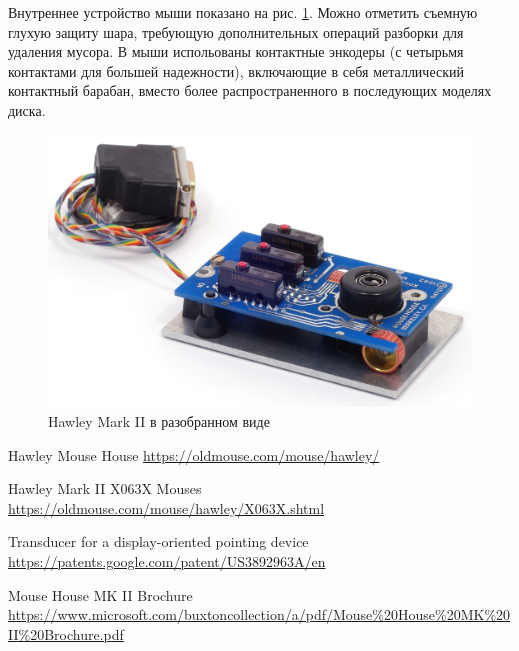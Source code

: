 \documentclass[11pt, a4paper]{article}
\begin{document}
Внутреннее устройство мыши показано на рис. \ref{fig:HawleyMarkIIInside}. Можно отметить съемную глухую защиту шара, требующую дополнительных операций разборки для удаления мусора. В мыши испольованы контактные энкодеры (с четырьмя контактами для большей надежности), включающие в себя металлический контактный барабан, вместо более распространенного в последующих моделях диска.

 \begin{figure}[h]
    \centering
    \includegraphics[scale=0.8]{1983_hawley_mark_ii/inside_60.jpg}
    \caption{Hawley Mark II в разобранном виде}
    \label{fig:HawleyMarkIIInside}
\end{figure}

\begin{thebibliography}{9}
 Hawley Mouse House \url{https://oldmouse.com/mouse/hawley/}

 Hawley Mark II X063X Mouses \url{https://oldmouse.com/mouse/hawley/X063X.shtml}

 Transducer for a display-oriented pointing device \url{https://patents.google.com/patent/US3892963A/en}

 Mouse House MK II Brochure \url{https://www.microsoft.com/buxtoncollection/a/pdf/Mouse%20House%20MK%20II%20Brochure.pdf}
\end{thebibliography}
\end{document}
